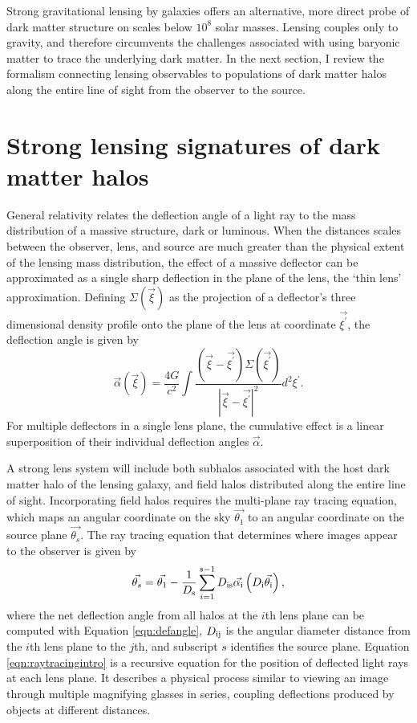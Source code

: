 Strong gravitational lensing by galaxies offers an alternative, more direct probe of dark matter structure on scales below $10^8$ solar masses. Lensing couples only to gravity, and therefore circumvents the challenges associated with using baryonic matter to trace the underlying dark matter. In the next section, I review the formalism connecting lensing observables to populations of dark matter halos along the entire line of sight from the observer to the source. 

\section{Strong lensing signatures of dark matter halos}
\indent General relativity relates the deflection angle of a light ray to the mass distribution of a massive structure, dark or luminous. When the distances scales between the observer, lens, and source are much greater than the physical extent of the lensing mass distribution, the effect of a massive deflector can be approximated as a single sharp deflection in the plane of the lens, the `thin lens' approximation. Defining $\Sigma\left(\vec{\xi}\right)$ as the projection of a deflector's three dimensional density profile onto the plane of the lens at coordinate $\vec{\xi^{\prime}}$, the deflection angle is given by \cite{BlandfordNarayan86}
\begin{equation}
\label{eqn:defangle}
\vec{\alpha}\left(\vec{\xi}\right) = \frac{4G }{c^2} \int \frac{\left(\vec{\xi} - \vec{\xi^{\prime}}\right) \Sigma\left(\vec{\xi^{\prime}}\right)}{| \vec{\xi} - \vec{\xi^{\prime}}|^2} d^2 \xi^{\prime}. 
\end{equation}
For multiple deflectors in a single lens plane, the cumulative effect is a linear superposition of their individual deflection angles $\vec{\alpha}$. 

A strong lens system will include both subhalos associated with the host dark matter halo of the lensing galaxy, and field halos distributed along the entire line of sight. Incorporating field halos requires the multi-plane ray tracing equation, which maps an angular coordinate on the sky $\vec{\theta_1}$ to an angular coordinate on the source plane $\vec{\theta_s}$. The ray tracing equation that determines where images appear to the observer is given by \cite{BlandfordNarayan86}
\begin{equation}
\label{eqn:raytracingintro}
\vec{\theta_s} = \vec{\theta_1} - \frac{1}{D_{\rm{s}}} \sum_{i=1}^{s-1} D_{\rm{is}}{\vec{\alpha_{\rm{i}}}} \left(D_{\rm{i}} \vec{\theta_{\rm{i}}}\right),
\end{equation} 
where the net deflection angle from all halos at the $i$th lens plane can be computed with Equation \ref{eqn:defangle}, $D_{\rm{ij}}$ is the angular diameter distance from the $i$th lens plane to the $j$th, and subscript $s$ identifies the source plane. Equation \ref{eqn:raytracingintro} is a recursive equation for the position of deflected light rays at each lens plane. It describes a physical process similar to viewing an image through multiple magnifying glasses in series, coupling deflections produced by objects at different distances. 

